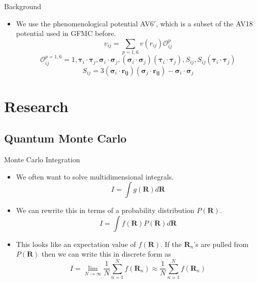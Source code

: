 \documentclass{beamer}
\renewcommand{\O}[2]{\mathcal{O}_{#2}^{#1}}
\newcommand{\R}{\mathbf{R}}
\newcommand{\ti}{\bm{\tau}_i}
\newcommand{\tj}{\bm{\tau}_j}
\newcommand{\si}{\bm{\sigma}_i}
\newcommand{\sj}{\bm{\sigma}_j}
\begin{document}
\begin{frame}{Background}
\begin{itemize}
   \item We use the phenomenological potential AV6$'$, which is a subset of the AV18 potential used in GFMC before.
   \begin{equation*}
      v_{ij} = \sum\limits_{p=1,6} v(r_{ij})\O{p}{ij}
   \end{equation*}
   \begin{equation*}
      \O{p=1,6}{ij} = 1, \ti\cdot\tj, \si\cdot\sj, (\si\cdot\sj)(\ti\cdot\tj), S_{ij}, S_{ij}(\ti\cdot\tj)
   \end{equation*}
   \begin{equation*}
      S_{ij} = 3(\si\cdot\mathbf{r_{ij}})(\sj\cdot\mathbf{r_{ij}})-\si\cdot\sj
   \end{equation*}
\end{itemize}
\end{frame}

\section{Research}
\subsection{Quantum Monte Carlo}
\begin{frame}{Monte Carlo Integration}
\begin{itemize}
   \item We often want to solve multidimensional integrals.
      \begin{equation*}
         I=\int g(\R)d\R
      \end{equation*}
   \item We can rewrite this in terms of a probability distribution $P(\R)$.
      \begin{equation*}
         I=\int f(\R)P(\R)d\R
      \end{equation*}
   \item This looks like an expectation value of $f(\R)$. If the $\R_n$'s are pulled from $P(\R)$ then we can write this in discrete form as
   \begin{equation*}
      I=\lim\limits_{N\rightarrow\infty} \frac{1}{N}\sum\limits_{n=1}^N f(\R_n) \approx \frac{1}{N}\sum\limits_{n=1}^N f(\R_n)
   \end{equation*}
\end{itemize}
\end{frame}
\end{document}
